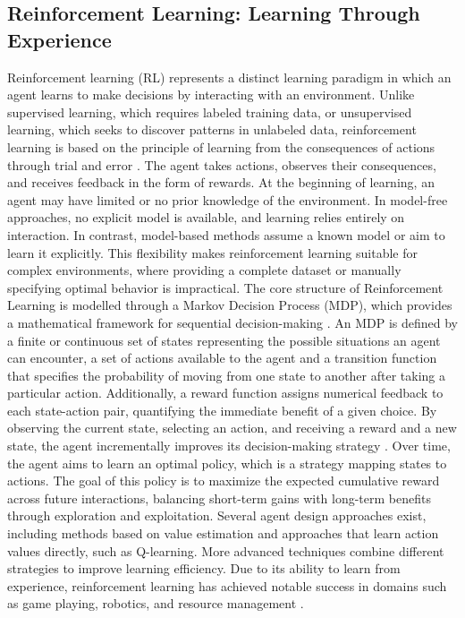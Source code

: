 \documentclass[12pt,a4paper]{report}
\begin{document}
\subsection{Reinforcement Learning: Learning Through Experience}

Reinforcement learning (RL) represents a distinct learning paradigm in which an agent learns to make decisions by interacting with an environment. Unlike supervised learning, which requires labeled training data, or unsupervised learning, which seeks to discover patterns in unlabeled data, reinforcement learning is based on the principle of learning from the consequences of actions through trial and error \cite{chiave49}. The agent takes actions, observes their consequences, and receives feedback in the form of rewards. At the beginning of learning, an agent may have limited or no prior knowledge of the environment. In model-free 
approaches, no explicit model is available, and learning relies entirely on interaction. In contrast, model-based methods assume a known model or aim to learn it explicitly. This flexibility makes reinforcement learning suitable for complex environments, where providing a complete dataset or manually specifying optimal behavior is impractical.
The core structure of Reinforcement Learning is modelled through a Markov Decision Process (MDP), which provides a mathematical framework for sequential decision-making \cite{chiave49}. An MDP is defined by a finite or continuous set of states representing the possible situations an agent can encounter, a set of actions available to the agent and a transition function that specifies the probability of moving from one state to another after taking a particular action. Additionally, a reward function assigns numerical feedback to each state-action pair, 
quantifying the immediate benefit of a given choice. By observing the current state, selecting an action, and receiving a reward and a new state, the agent incrementally improves its decision-making strategy \cite{chiave45}.
Over time, the agent aims to learn an optimal policy, which is a strategy mapping states to actions. The goal of this policy is to maximize the expected cumulative reward across future interactions, balancing short-term gains with long-term benefits through exploration and exploitation.
Several agent design approaches exist, including methods based on value estimation and approaches that learn action values directly, such as Q-learning. More advanced techniques combine different strategies to improve learning efficiency. 
Due to its ability to learn from experience, reinforcement learning has achieved notable success in domains such as game playing, robotics, and resource management \cite{chiave45}.
\end{document}
